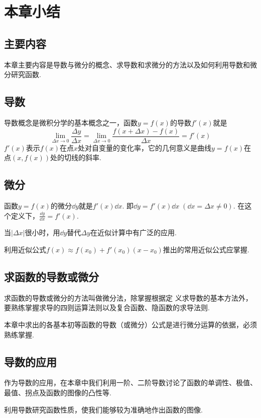 \section{本章小结}
\subsection{主要内容}
本章主要内容是导数与微分的概念、求导数和求微分的方法以及如何利用导数和微分研究函数.

\subsection{导数}
导数概念是微积分学的基本概念之一，函数$y=f(x)$的导数$f'(x)$就是
\[\lim_{\Delta x\to 0}\frac{\Delta y}{\Delta x}=\lim_{\Delta x\to 0}\frac{f(x+\Delta x)-f(x)}{\Delta x}=f'(x)\]
$f'(x)$表示$f(x)$在点$x$处对自变量的变化率，它的几何意义是曲线$y=f(x)$在点$(x,f(x))$处的切线的斜率.

\subsection{微分}
函数$y=f(x)$的微分$\dd y$就是$f'(x)\dd x$. 即$\dd y=f'(x)\dd x\; (\dd x=\Delta x\ne 0)$. 在这个定义下，$\frac{\dd y}{\dd x}=f'(x)$.

当$|\Delta x|$很小时，用$\dd y$替代$\Delta y$在近似计算中有广泛的应用.

利用近似公式$f(x)\approx f(x_0)+f'(x_0)(x-x_0)$推出的常用近似公式应掌握.

\subsection{求函数的导数或微分}
求函数的导数或微分的方法叫做微分法，除掌握根据定
义求导数的基本方法外，要熟练掌握求导的四则运算法则以及复合函数、隐函数的求导法则.

本章中求出的各基本初等函数的导数（或微分）公式是进行微分运算的依据，必须熟练掌握.

\subsection{导数的应用}
作为导数的应用，在本章中我们利用一阶、二阶导数讨论了函数的单调性、极值、最值、拐点及函数的图像的凸性等.

利用导数研究函数性质，使我们能够较为准确地作出函数的图像.

